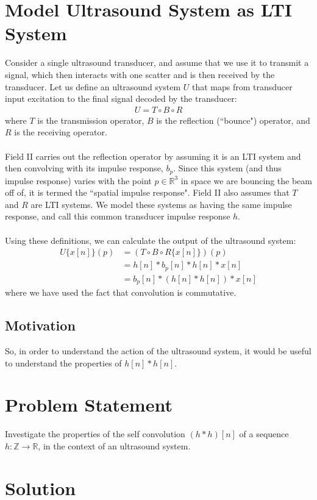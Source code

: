 \documentclass[a4paper]{article}
\newcommand{\op}[2]{#1\{#2\}}
\begin{document}
\section*{Model Ultrasound System as LTI System}
Consider a single ultrasound transducer, and assume that we use it to transmit a signal, which then interacts with one scatter and is then received by the transducer. Let us define an ultrasound system $U$ that maps from transducer input excitation to the final signal decoded by the transducer:
\begin{align*}
U = T \circ B \circ R
\end{align*}
where $T$ is the transmission operator, $B$ is the reflection (``bounce") operator, and $R$  is the receiving operator.
\\\\
Field II carries out the reflection operator by assuming it is an LTI system and then convolving with its impulse response, $b_p$. Since this system (and thus impulse response) varies with the point $p \in \mathbb{R}^3$ in space we are bouncing the beam off of, it is termed the ``spatial impulse response". Field II also assumes that $T$ and $R$ are LTI systems. We model these systems as having the same impulse response, and call this common transducer impulse response $h$. 
\\\\
Using these definitions, we can calculate the output of the ultrasound system:
\begin{align*}
\op{U}{x[n]}(p) &= (\op{T \circ B \circ R}{x[n]})(p) \\
&= h[n] *b_p[n] * h[n] * x[n] \\
&= b_p[n] * (h[n] * h[n]) *x[n]
\end{align*}
where we have used the fact that convolution is commutative.
\clearpage
\subsection*{Motivation}
So, in order to understand the action of the ultrasound system, it would be useful to understand the properties of $h[n] * h[n]$.
\section*{Problem Statement}
Investigate the properties of  the self convolution $(h*h)[n]$ of a sequence $h: \mathbb{Z} \rightarrow \mathbb{R}$, in the context of an ultrasound system.
\section*{Solution}
\end{document}
